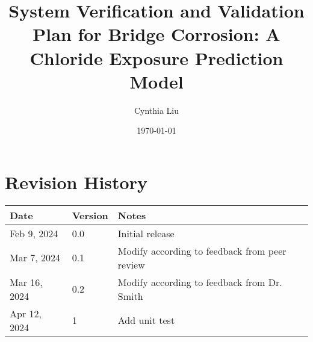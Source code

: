 \documentclass[12pt, titlepage]{article}
\begin{document}
\title{System Verification and Validation Plan for Bridge Corrosion: A Chloride Exposure Prediction Model} 
\author{Cynthia Liu}
\date{\today}
	
\maketitle


\section*{Revision History}

\begin{tabularx}{\textwidth}{p{2.5cm}p{1.5cm}X}
\toprule {\bf Date} & {\bf Version} & {\bf Notes}\\
\midrule
Feb 9, 2024 & 0.0 & Initial release\\
Mar 7, 2024 & 0.1 & Modify according to feedback from peer review\\
Mar 16, 2024 & 0.2 & Modify according to feedback from Dr. Smith\\
Apr 12, 2024 & 1 & Add unit test\\
\bottomrule
\end{tabularx}



\newpage

\tableofcontents

\listoftables

\end{document}
